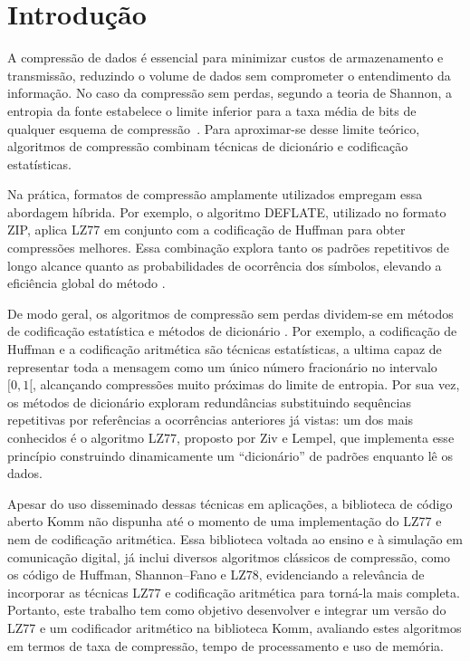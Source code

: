 \chapter{Introdução}\label{cap:introducao}
A compressão de dados é essencial para minimizar custos de armazenamento e transmissão, reduzindo o volume de dados sem comprometer o entendimento da informação. No caso da compressão sem perdas, segundo a teoria de Shannon, a entropia da fonte estabelece o limite inferior para a taxa média de bits de qualquer esquema de compressão~\cite{mackay2003information}. Para aproximar-se desse limite teórico, algoritmos de compressão combinam técnicas de dicionário e codificação estatísticas.

Na prática, formatos de compressão amplamente utilizados empregam essa abordagem híbrida. Por exemplo, o algoritmo DEFLATE, utilizado no formato ZIP, aplica LZ77 em conjunto com a codificação de Huffman para obter compressões melhores. Essa combinação explora tanto os padrões repetitivos de longo alcance quanto as probabilidades de ocorrência dos símbolos, elevando a eficiência global do método \cite{rfc1951}.

De modo geral, os algoritmos de compressão sem perdas dividem-se em métodos de codificação estatística e métodos de dicionário \cite{sayood2012introduction}. Por exemplo, a codificação de Huffman e a codificação aritmética são técnicas estatísticas, a ultima capaz de representar toda a mensagem como um único número fracionário no intervalo $[0, 1[$, alcançando compressões muito próximas do limite de entropia. Por sua vez, os métodos de dicionário exploram redundâncias substituindo sequências repetitivas por referências a ocorrências anteriores já vistas: um dos mais conhecidos é o algoritmo LZ77, proposto por Ziv e Lempel\cite{1055714}, que implementa esse princípio construindo dinamicamente um ``dicionário'' de padrões enquanto lê os dados.

Apesar do uso disseminado dessas técnicas em aplicações, a biblioteca de código aberto Komm não dispunha até o momento de uma implementação do LZ77 e nem de codificação aritmética. Essa biblioteca voltada ao ensino e à simulação em comunicação digital, já inclui diversos algoritmos clássicos de compressão, como os código de Huffman, Shannon--Fano e LZ78, evidenciando a relevância de incorporar as técnicas LZ77 e codificação aritmética para torná-la mais completa. Portanto, este trabalho tem como objetivo desenvolver e integrar um versão do LZ77 e um codificador aritmético na biblioteca Komm, avaliando estes algoritmos em termos de taxa de compressão, tempo de processamento e uso de memória.

